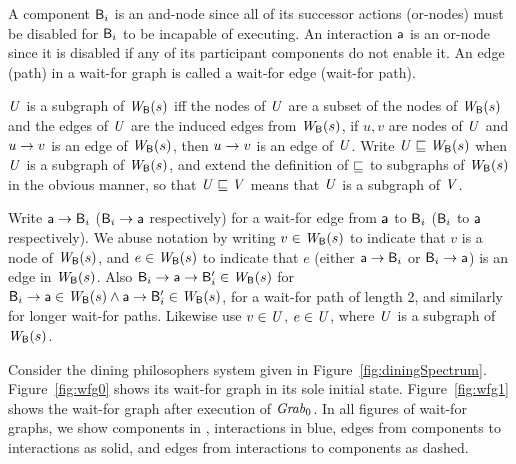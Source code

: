 A component $\mathsf{B}_i$ is an and-node since all of its successor actions (or-nodes) must be disabled for
$\mathsf{B}_i$ to be incapable of executing.  An interaction $\mathsf{a}$ is an or-node since it is disabled if
any of its participant components do not enable it.  An edge (path) in a wait-for graph is called a
wait-for edge (wait-for path). 


\begin{definition} \label{defn:wsubgraph}
$\mathit{U}$ is a subgraph of $\mathit{W}_{\mathsf{B}}({s})$ iff the nodes of $\mathit{U}$ are a subset of the nodes of $\mathit{W}_{\mathsf{B}}({s})$ and the edges of $\mathit{U}$ are the induced edges from 
$\mathit{W}_{\mathsf{B}}({s})$, \ie if $u,v$ are nodes of $\mathit{U}$ and $u \rightarrow v$ is an edge of $\mathit{W}_{\mathsf{B}}({s})$, then $u \rightarrow v$ is an edge of $\mathit{U}$.
Write $\mathit{U} \sqsubseteq \mathit{W}_{\mathsf{B}}({s})$ when $\mathit{U}$ is a subgraph of $\mathit{W}_{\mathsf{B}}({s})$, and extend the definition of $\sqsubseteq$ to subgraphs of $\mathit{W}_{\mathsf{B}}({s})$ in the obvious
manner, so that $\mathit{U} \sqsubseteq \mathit{V}$ means that $\mathit{U}$ is a subgraph of $\mathit{V}$.
\end{definition}

Write $\mathsf{a} \rightarrow \mathsf{B}_i$ ($\mathsf{B}_i \rightarrow \mathsf{a}$ respectively) for a
wait-for edge from $\mathsf{a}$ to $\mathsf{B}_i$ ($\mathsf{B}_i$ to $\mathsf{a}$ respectively).  We abuse notation by writing
$v \in \mathit{W}_{\mathsf{B}}({s})$ to indicate that $v$ is a node of $\mathit{W}_{\mathsf{B}}({s})$, and 
$e \in \mathit{W}_{\mathsf{B}}({s})$ to indicate that $e$ (either $\mathsf{a} \rightarrow \mathsf{B}_i$ or $\mathsf{B}_i \rightarrow \mathsf{a}$) is an edge in
$\mathit{W}_{\mathsf{B}}({s})$. 
Also $\mathsf{B}_i \rightarrow \mathsf{a} \rightarrow \mathsf{B}'_i \in \mathit{W}_{\mathsf{B}}({s})$ for
$\mathsf{B}_i \rightarrow \mathsf{a} \in \mathit{W}_{\mathsf{B}}({s}) \land \mathsf{a} \rightarrow \mathsf{B}'_i \in \mathit{W}_{\mathsf{B}}({s})$, \ie for a wait-for path of
length 2, and similarly for longer wait-for paths.
Likewise use $v \in \mathit{U}$, $e \in \mathit{U}$, where $\mathit{U}$ is a subgraph of $\mathit{W}_{\mathsf{B}}({s})$.



Consider the dining philosophers system given in Figure~\ref{fig:diningSpectrum}.
Figure~\ref{fig:wfg0} shows its wait-for graph in its sole initial state.  Figure~\ref{fig:wfg1}
shows the wait-for graph after execution of $\mathit{Grab}_0$.  
In all figures of wait-for graphs, we show components in , interactions in \ac{blue}, 
edges from components to interactions as solid, and edges from interactions to components as dashed.

